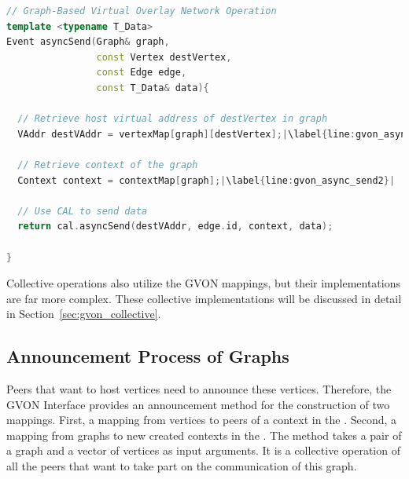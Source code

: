\begin{minipage}[t]{\textwidth} 
\begin{lstlisting}[language=C++, label=lst:comm_gvon, caption={The \cpp{vertexMap} is used to translate vertices to virtual addresses and \cpp{graphMap} is used to translate graphs to contexts. The communication operation is performed by the the CAL.}, escapechar=| ]
// Graph-Based Virtual Overlay Network Operation  
template <typename T_Data>
Event asyncSend(Graph& graph, 
                const Vertex destVertex, 
                const Edge edge, 
                const T_Data& data){ 

  // Retrieve host virtual address of destVertex in graph
  VAddr destVAddr = vertexMap[graph][destVertex];|\label{line:gvon_async_send1}|

  // Retrieve context of the graph
  Context context = contextMap[graph];|\label{line:gvon_async_send2}|

  // Use CAL to send data
  return cal.asyncSend(destVAddr, edge.id, context, data);

}
\end{lstlisting}
\end{minipage}

\noindent Collective operations also utilize the GVON mappings, but their
implementations are far more complex. These collective implementations will be
discussed in detail in Section~\ref{sec:gvon_collective}.


\subsection{Announcement Process of Graphs}
\label{sec:announcement_impl}

Peers that want to host vertices need to announce these vertices.
Therefore, the GVON Interface provides an announcement method for the
construction of two mappings. First, a mapping from vertices to peers
of a context in the . Second, a mapping from graphs to
new created contexts in the .  The method takes a pair
of a graph and a vector of vertices as input arguments.  It is a
collective operation of all the peers that want to take part on the
communication of this graph.

